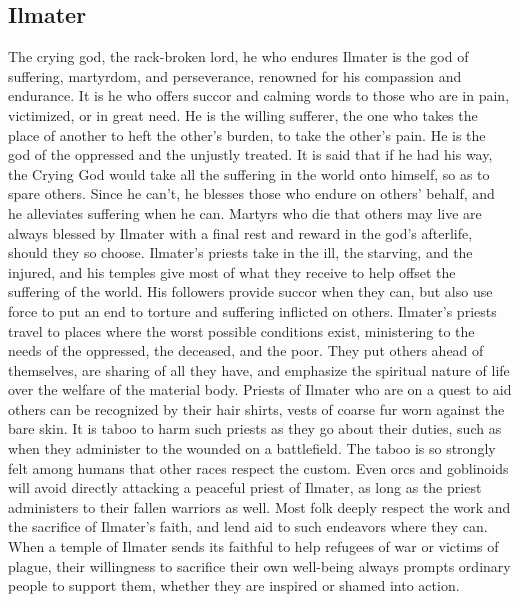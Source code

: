 \documentclass[10pt,a4paper,twoside,twocolumn,openany,bg=print,nodeprecatedcode]{dndbook}
\begin{document}
\subsection{Ilmater}
The crying god, the rack-broken lord, he who endures
Ilmater is the god of suffering, martyrdom, and perseverance, renowned for his compassion and endurance. It is he who offers succor and calming words to those who are in pain, victimized, or in great need. He is the willing sufferer, the one who takes the place of another to heft the other's burden, to take the other's pain. He is the god of the oppressed and the unjustly treated.
It is said that if he had his way, the Crying God would take all the suffering in the world onto himself, so as to spare others. Since he can't, he blesses those who endure on others' behalf, and he alleviates suffering when he can. Martyrs who die that others may live are always blessed by Ilmater with a final rest and reward in the god's afterlife, should they so choose.
Ilmater's priests take in the ill, the starving, and the injured, and his temples give most of what they receive to help offset the suffering of the world. His followers provide succor when they can, but also use force to put an end to torture and suffering inflicted on others. Ilmater's priests travel to places where the worst possible conditions exist, ministering to the needs of the oppressed, the deceased, and the poor. They put others ahead of themselves, are sharing of all they have, and emphasize the spiritual nature of life over the welfare of the material body.
Priests of Ilmater who are on a quest to aid others can be recognized by their hair shirts, vests of coarse fur worn against the bare skin. It is taboo to harm such priests as they go about their duties, such as when they administer to the wounded on a battlefield. The taboo is so strongly felt among humans that other races respect the custom. Even orcs and goblinoids will avoid directly attacking a peaceful priest of Ilmater, as long as the priest administers to their fallen warriors as well.
Most folk deeply respect the work and the sacrifice of Ilmater's faith, and lend aid to such endeavors where they can. When a temple of Ilmater sends its faithful to help refugees of war or victims of plague, their willingness to sacrifice their own well-being always prompts ordinary people to support them, whether they are inspired or shamed into action.
\end{document}
